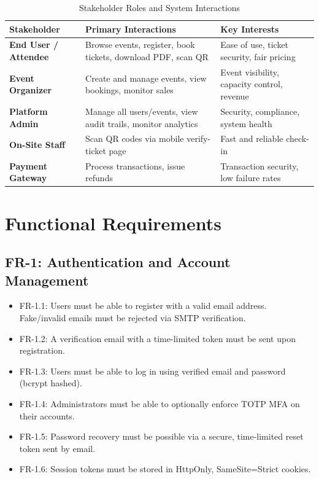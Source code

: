 \documentclass[12pt,a4paper]{report}
\begin{document}
\begin{table}[H]
    \centering
    \caption{Stakeholder Roles and System Interactions}
    \vspace{0.2cm}
    \begin{tabular}{|p{3cm}|p{5cm}|p{6cm}|}
        \hline
        \textbf{Stakeholder} & \textbf{Primary Interactions} & \textbf{Key Interests} \\
        \hline
        \textbf{End User / Attendee} & Browse events, register, book tickets, download PDF, scan QR & Ease of use, ticket security, fair pricing \\
        \hline
        \textbf{Event Organizer} & Create and manage events, view bookings, monitor sales & Event visibility, capacity control, revenue \\
        \hline
        \textbf{Platform Admin} & Manage all users/events, view audit trails, monitor analytics & Security, compliance, system health \\
        \hline
        \textbf{On-Site Staff} & Scan QR codes via mobile verify-ticket page & Fast and reliable check-in \\
        \hline
        \textbf{Payment Gateway} & Process transactions, issue refunds & Transaction security, low failure rates \\
        \hline
    \end{tabular}
\end{table}

\section{Functional Requirements}

\subsection{FR-1: Authentication and Account Management}
\begin{itemize}[leftmargin=2em]
    \item FR-1.1: Users must be able to register with a valid email address. Fake/invalid emails must be rejected via SMTP verification.
    \item FR-1.2: A verification email with a time-limited token must be sent upon registration.
    \item FR-1.3: Users must be able to log in using verified email and password (bcrypt hashed).
    \item FR-1.4: Administrators must be able to optionally enforce TOTP MFA on their accounts.
    \item FR-1.5: Password recovery must be possible via a secure, time-limited reset token sent by email.
    \item FR-1.6: Session tokens must be stored in HttpOnly, SameSite=Strict cookies.
\end{itemize}
\end{document}
